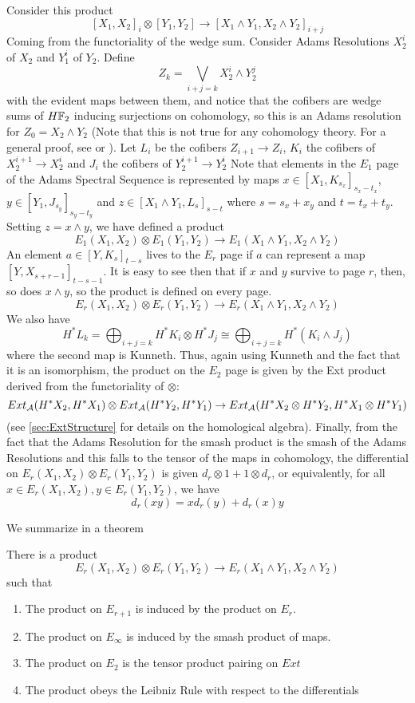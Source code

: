 Consider this product
\[[X_1,X_2]_i\otimes[Y_1,Y_2]\to [X_1\wedge Y_1,X_2\wedge Y_2]_{i+j}\]
Coming from the functoriality of the wedge sum.  
Consider Adams Resolutions $X_2^{i}$ of $X_2$ and $Y_1^i$ of $Y_2$.  Define
\[Z_k=\bigvee_{i+j=k} X_2^i\wedge Y_2^j\]
with the evident maps between them, and notice that the cofibers are wedge sums of $H\mathbb{F}_2$ inducing surjections on cohomology, so this is an Adams resolution for $Z_0=X_2\wedge Y_2$ (Note that this is not true for any cohomology theory.  For a general proof, see \cite[Ch~2.3]{RavenelGreen} or \cite[Ch~IV]{H00RingSpectra}).   
Let $L_i$ be the cofibers $Z_{i+1}\to Z_i$, $K_i$ the cofibers of $X_2^{i+1}\to X_2^i$ and $J_i$ the cofibers of  $Y_2^{i+1}\to Y_2^i$
Note that elements in the $E_1$ page of the Adams Spectral Sequence is represented by maps $x\in [X_1,K_{s_x}]_{s_x-t_x}$, $y\in [Y_1,J_{s_y}]_{s_y-t_y}$ and $z\in [X_1\wedge Y_1,L_s]_{s-t}$ where $s=s_x+x_y$ and $t=t_x+t_y$.  Setting $z=x\wedge y$, we have defined a product
\[E_1(X_1,X_2)\otimes E_1(Y_1,Y_2)\to E_1(X_1\wedge Y_1,X_2\wedge Y_2)\]
An element $a\in [Y,K_s]_{t-s}$ lives to the $E_r$ page if $a$ can represent a map $[Y,X_{s+r-1}]_{t-s-1}$.  
It is easy to see then that if $x$ and $y$ survive to page $r$, then, so does $x\wedge y$, so the product is defined on every page.  
\[E_r(X_1,X_2)\otimes E_r(Y_1,Y_2)\to E_r(X_1\wedge Y_1,X_2\wedge Y_2)\]
We also have
\[H^*L_k=\bigoplus_{i+j=k} H^*K_i\otimes H^*J_j\cong\bigoplus_{i+j=k} H^*(K_i\wedge J_j)\]
where the second map is Kunneth. 
Thus, again using Kunneth and the fact that it is an isomorphism, the product on the $E_2$ page is given by the Ext product derived from the functoriality of $\otimes$:
\[Ext_{\mathcal{A}}(H^*X_2,H^*X_1)\otimes Ext_{\mathcal{A}}(H^*Y_2,H^*Y_1)\to Ext_{\mathcal{A}}(H^*X_2\otimes H^*Y_2,H^*X_1\otimes H^*Y_1)\]
(see \ref{sec:ExtStructure} for details on the homological algebra).  
Finally, from the fact that the Adams Resolution for the smash product is the smash of the Adams Resolutions and this falls to the tensor of the maps in cohomology, the differential on $E_r(X_1,X_2)\otimes E_r(Y_1,Y_2)$ is given $d_r\otimes 1+1\otimes d_r$, or equivalently, for all $x\in E_r(X_1,X_2),y\in  E_r(Y_1,Y_2)$, we have
\[d_r(xy)=xd_r(y)+d_r(x)y\]

We summarize in a theorem
\begin{Theorem}
  There is a product
  \[E_r(X_1,X_2)\otimes E_r(Y_1,Y_2)\to E_r(X_1\wedge Y_1,X_2\wedge Y_2)\]
  such that
  \begin{enumerate}
    \item The product on $E_{r+1}$ is induced by the product on $E_r$.
    \item The product on $E_\infty$ is induced by the smash product of maps.
    \item The product on $E_2$ is the tensor product pairing on $Ext$
    \item The product obeys the Leibniz Rule with respect to the differentials
  \end{enumerate}
\end{Theorem}


